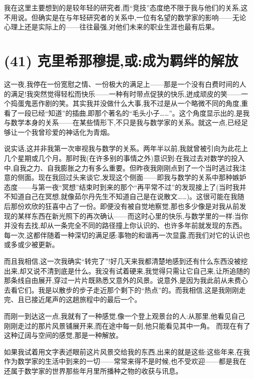  我在这里主要想到的是较年轻的研究者,而“竞技”态度绝不限于我与他们的关系,这不用说。但确实是在与年轻研究者的关系中,一位有名望的数学家的影响——无论心理上还是实际上的——往往最强,对他们未来的职业生涯也最有后果。

\section{(41) 克里希那穆提,或:成为羁绊的解放}

 这一夜,我停在一份宽慰之情、一份极大的满足上——那是一个没有白费时间的人的满足!我突然觉得轻松而快乐——一种有时带点促狭的快乐,迸成顽皮的笑——一个捣蛋鬼恶作剧的笑。其实我并没做什么大事,我不过是从一个略微不同的角度,重看了一段已经“知道”的插曲,即那个著名的“毛头小子……”。这个角度显示出的,是我与数学本身的关系——在某些情形下,不只是我与数学家的关系。就这一点,已经足够让一个我曾珍爱的神话化为青烟。

说实话,这并非我第一次审视我与数学的关系。两年半以前,我就曾被引向为此花上几个星期或几个月。那时我(在许多别的事情之外)意识到:在我过去对数学的投入中,自我之力、自我膨胀之力有多么重要。但昨夜我刚刚点到了一个当时逃过我注意的侧面。现在我回过头来谈它,发现这个侧面——即我与数学的关系中那种嫉妒态度——与第一夜“冥想”结束时到来的那个“再平常不过”的发现接上了(当时我并不知道自己在冥想,就像茹尔丹先生不知道自己是在说散文……)。这很可能在我随后那份欢欣的狂喜中占了一份。即便没有被自觉地察觉,那也多少像是对我从前发现的某样东西在新光照下的再次确认——而这时心里的快乐,与数学里的一样:当你并没有去找,却从一条完全不同的路径撞上你认识的、也许多年前就发现的东西。每一次,这都伴随着一种深切的满足感:事物的和谐再一次显露,而我们对它的认识也或多或少被更新。

而且我相信,这一次我确实“转完了”!好几天来我都清楚地感到还有什么东西没被挖出来,却又说不清到底是什么。我没有试着硬来,我觉得只需让它自己来,让所追随的那条线自由展开,穿过一片片既熟悉又意外的风景。说意外,是因为我此前从未费心去看它们。我是以散步的步子走近那个剩下的“热点”的。而我相信,这是我刚刚走完、且已接近尾声的这趟旅程中的最后一个。

而刚一到达这一点,我就有了一种感觉,像一个登上观景台的人:从那里,他看见自己刚刚走过的那片风景铺展开来,而在途中每一刻,他只能看见其中一角。
 而现在有了这种辽阔与空间的感觉,那是一种解放。

如果我试着用文字表述眼前这片风景交给我的东西,出来的就是这些:这些年来,在我作为数学家的生活中到来的一切——常常来得不是时候,也不受欢迎——都是我在还属于数学家的世界那些年月里所播种之物的收获与讯息。


